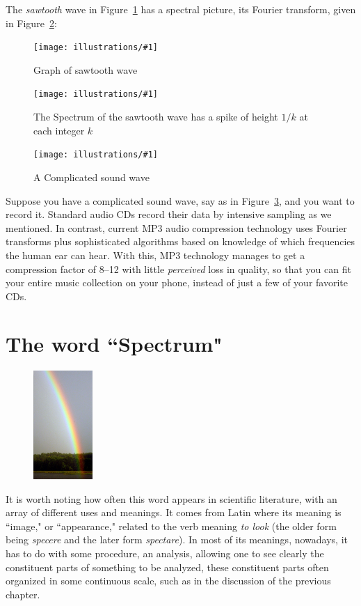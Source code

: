\documentclass[openany]{book}
\newcommand{\ill}[3]{%
   \begin{figure}[H]%
   \vspace{-2ex}
   \centering%
   \texttt{[image: illustrations/\#1]}%
   \caption{#3}%
   \vspace{-2ex}
    \end{figure}}
\theoremstyle{plain}
\theoremstyle{definition}
\begin{document}
{The {\em sawtooth} wave in Figure~\ref{fig:sawtooth} has a spectral picture, its Fourier transform, given in Figure~\ref{fig:sawtooth-spectrum}:

   \ill{sawtooth}{.7}{Graph of sawtooth wave\label{fig:sawtooth}}
   \ill{sawtooth-spectrum}{.7}{The Spectrum of the sawtooth wave has a spike of height $1/k$ at
each integer $k$\label{fig:sawtooth-spectrum}}



 \ill{complicated-wave}{.7}{A Complicated sound wave\label{fig:complicated-wave}}

Suppose you have a complicated sound wave, say as in
Figure~\ref{fig:complicated-wave}, and you want to record it.
Standard audio CDs record their data by intensive sampling as we
mentioned. In contrast, current MP3 audio compression technology uses
Fourier transforms plus sophisticated algorithms based on
knowledge of which frequencies the human ear can hear.
With this, MP3 technology manages to
get a compression factor of 8--12 with little {\em perceived} loss in
quality, so that you can fit your entire music collection on your
phone, instead of just a few of your favorite CDs.

\chapter{The word ``Spectrum"}

\begin{figure}
    \includegraphics[width=0.2\textwidth]{illustrations/rainbow}
\end{figure}

  It is worth noting how often this word appears in scientific literature, with an array of different uses and meanings.   It  comes from Latin where its meaning is ``image," or ``appearance," related to the verb meaning {\it to look} (the older form being  {\it specere} and the later form {\it spectare}).  In most of its meanings, nowadays, it has to do with some procedure, an analysis, allowing one to see clearly the  constituent parts of something to be analyzed, these constituent parts often organized in some continuous scale, such as in the discussion of the previous chapter.

}
\end{document}
